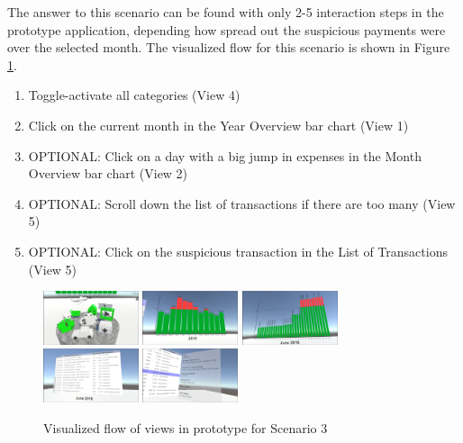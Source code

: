 The answer to this scenario can be found with only 2-5 interaction steps in the prototype application, depending how spread out the suspicious payments were over the selected month. The visualized flow for this scenario is shown in Figure \ref{fig:scenariothreeprototype}.
\begin{enumerate}
	\item Toggle-activate all categories (View 4)
	\item Click on the current month in the Year Overview bar chart (View 1)
	\item OPTIONAL: Click on a day with a big jump in expenses in the Month Overview bar chart (View 2)
	\item OPTIONAL: Scroll down the list of transactions if there are too many (View 5)
	\item OPTIONAL: Click on the suspicious transaction in the List of Transactions (View 5)
\end{enumerate}
\begin{figure}[h]
	\begin{center}
		\includegraphics[width=2.8cm]{03_Figures/08_Development/View4_CategoriesFiltering.png}
		\includegraphics[width=2.8cm]{03_Figures/08_Development/View1_YearOverview.png}
		\includegraphics[width=2.8cm]{03_Figures/08_Development/View2_MonthOverview.png}
		\includegraphics[width=2.8cm]{03_Figures/08_Development/View5_FinTransactionsOverview.png}
		\includegraphics[width=2.8cm]{03_Figures/08_Development/View6_FinTransactionDetails.png}
		\caption{Visualized flow of views in prototype for Scenario 3}
		\label{fig:scenariothreeprototype}
	\end{center}
\end{figure}

